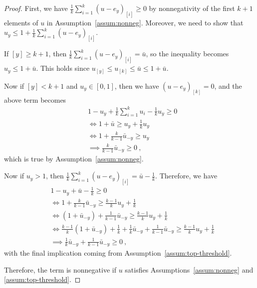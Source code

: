 \documentclass[12pt]{article}
\begin{document}
\begin{proof}
	First, we have $\frac 1 k \sum_{i=1}^k (u-e_y)_{[i]} \geq 0$ by nonnegativity of the first $k+1$ elements of $u$ in Assumption~\ref{assum:nonneg}.
	Moreover, we need to show that $u_y \leq 1 + \frac 1 k \sum_{i=1}^k (u-e_y)_{[i]}$.
	
	If $[y] \geq k+1$, then $\frac 1 k \sum_{i=1}^k (u-e_y)_{[i]} = \bar u$, so the inequality becomes $u_y \leq 1 + \bar u$.
	This holds since $u_{[y]} \leq u_{[k]} \leq \bar u \leq 1 + \bar u$.
	
	Now if $[y] < k+1$ and $u_y \in [0,1]$, then we have $(u-e_y)_{[k]} = 0$, and the above term becomes
	\begin{align*}
	&1 -u_y + \frac{1}{k} \sum_{i=1}^{k} u_i - \frac 1 k u_y \geq 0\\
	&\iff 1 + \bar u \geq u_y + \frac{1}{k} u_y\\
	&\iff 1 + \frac k {k-1} \bar u_{-y} \geq u_y\\
	&\implies \frac k {k-1} \bar u_{-y} \geq 0~,~
	\end{align*}
	which is true by Assumption~\ref{assum:nonneg}.
	
	Now if $u_y > 1$, then $\frac 1 k \sum_{i=1}^k (u-e_y)_{[i]} = \bar u - \frac 1 k$.
	Therefore, we have 
	\begin{align*}
	&1 -u_y + \bar u - \frac 1 k \geq 0\\
	&\iff 1 + \frac{k}{k-1}\bar u_{-y} \geq \frac{k-1}{k} u_y + \frac 1 k\\
	&\iff (1 + \bar u_{-y}) + \frac 1 {k-1} \bar u_{-y} \geq \frac{k-1}{k} u_y + \frac 1 k\\
	&\iff \frac{k-1}{k}(1 + \bar u_{-y}) + \frac 1 k + \frac{1}{k}\bar u_{-y} + \frac 1 {k-1} \bar u_{-y} \geq \frac{k-1}{k} u_y + \frac 1 k\\
	&\implies \frac{1}{k}\bar u_{-y}+ \frac{1}{k-1}\bar u_{-y} \geq 0~,~
	\end{align*}
	with the final implication coming from Assumption~\ref{assum:top-threshold}.
	
	Therefore, the term is nonnegative if $u$ satisfies Assumptions~\ref{assum:nonneg} and \ref{assum:top-threshold}.
\end{proof}
\end{document}
